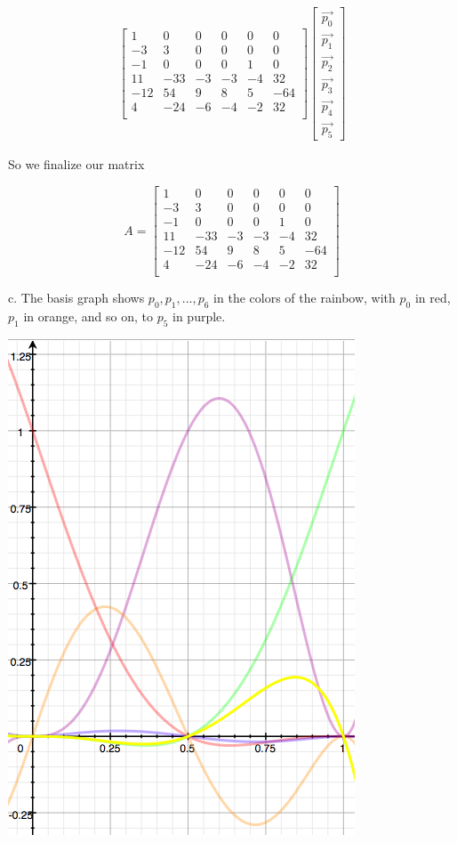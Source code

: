 \documentclass{letter}
\begin{document}
\begin{align*}
\begin{bmatrix}
1 & 0 & 0 & 0 & 0 & 0 \\
-3 & 3 & 0 & 0 & 0 & 0 \\
-1 & 0 & 0 & 0 & 1 & 0 \\
11 & -33 & -3 & -3 & -4 & 32 \\
-12 & 54 & 9 & 8 & 5 & -64 \\
4 & -24 & -6 & -4 & -2 & 32 \\
\end{bmatrix}
\begin{bmatrix}
\vec{p_0} \\
\vec{p_1} \\
\vec{p_2} \\
\vec{p_3} \\
\vec{p_4} \\
\vec{p_5} 
\end{bmatrix}
\end{align*}

So we finalize our matrix

$$A = 
\begin{bmatrix}
1 & 0 & 0 & 0 & 0 & 0 \\
-3 & 3 & 0 & 0 & 0 & 0 \\
-1 & 0 & 0 & 0 & 1 & 0 \\
11 & -33 & -3 & -3 & -4 & 32 \\
-12 & 54 & 9 & 8 & 5 & -64 \\
4 & -24 & -6 & -4 & -2 & 32 \\
\end{bmatrix}
$$

c. The basis graph shows $p_0, p_1, ... , p_6$ in the colors of the rainbow, with $p_0$ in red, $p_1$ in orange, and so on, to $p_5$ in purple. 

\includegraphics{basis-graph}
\end{document}
